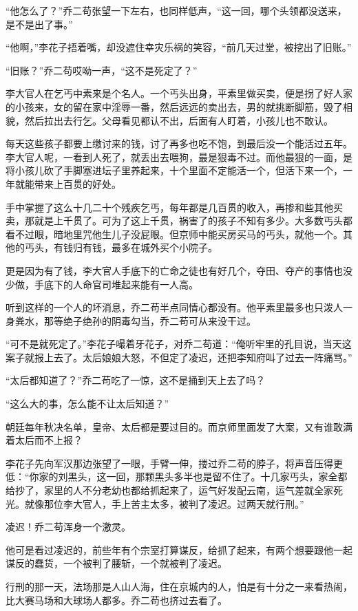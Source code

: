 “他怎么了？”乔二苟张望一下左右，也同样低声，“这一回，哪个头领都没送来，是不是出了事。”

“他啊，”李花子捂着嘴，却没遮住幸灾乐祸的笑容，“前几天过堂，被挖出了旧账。”

“旧账？”乔二苟哎呦一声，“这不是死定了？”

李大官人在乞丐中素来是个名人。一个丐头出身，平素里做买卖，便是拐了好人家的小孩来，女的留在家中淫辱一番，然后远远的卖出去，男的就挑断脚筋，毁了相貌，然后拉出去行乞。父母看见都认不出，后面有人盯着，小孩儿也不敢认。

每天这些孩子都要上缴讨来的钱，讨了再多也吃不饱，到最后没一个能活过五年。李大官人呢，一看到人死了，就丢出去喂狗，最是狠毒不过。而他最狠的一面，是将小孩儿砍了手脚塞进坛子里养起来，十个里面不定能活一个，但活下来一个，一年就能带来上百贯的好处。

手中掌握了这么十几二十个残疾乞丐，每年都是几百贯的收入，再掺和些其他买卖，那就是上千贯了。可为了这上千贯，祸害了的孩子不知有多少。大多数丐头都看不过眼，暗地里咒他生儿子没屁眼。但京师中能买房买马的丐头，就他一个。其他的丐头，有钱归有钱，最多在城外买个小院子。

更是因为有了钱，李大官人手底下的亡命之徒也有好几个，夺田、夺产的事情也没少做，手底下的人命官司堆起来能有一人高。

听到这样的一个人的坏消息，乔二苟半点同情心都没有。他平素里最多也只泼人一身粪水，那等绝子绝孙的阴毒勾当，乔二苟可从来没干过。

“可不是就死定了。”李花子嘬着牙花子，对乔二苟道：“俺听牢里的孔目说，当天这案子就报上去了。太后娘娘大怒，不但定了凌迟，还把李知府叫了过去一阵痛骂。”

“太后都知道了？”乔二苟吃了一惊，这不是捅到天上去了吗？

“这么大的事，怎么能不让太后知道？”

朝廷每年秋决名单，皇帝、太后都是要过目的。而京师里面发了大案，又有谁敢满着太后而不上报？

李花子先向军汉那边张望了一眼，手臂一伸，搂过乔二苟的脖子，将声音压得更低：“你家的刘黑头，这一回，那颗黑头多半也是留不住了。十几家丐头，家全都给抄了，家里的人不分老幼也都给抓起来了，运气好发配云南，运气差就全家死光。就像那位李大官人，手上苦主太多，被判了凌迟。过两天就行刑。”

凌迟！乔二苟浑身一个激灵。

他可是看过凌迟的，前些年有个宗室打算谋反，给抓了起来，有两个想要跟他一起谋反的蠢货，一个被判了腰斩，一个就被判了凌迟。

行刑的那一天，法场那是人山人海，住在京城内的人，怕是有十分之一来看热闹，比大赛马场和大球场人都多。乔二苟也挤过去看了。

